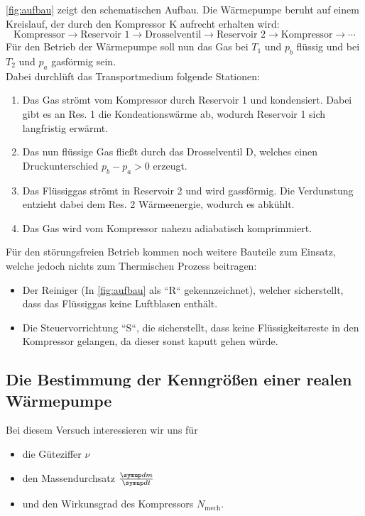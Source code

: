 \autoref{fig:aufbau} zeigt den schematischen Aufbau. Die W\"armepumpe beruht auf einem Kreislauf,
der durch den Kompressor K aufrecht erhalten wird:
\begin{equation}
	\text{Kompressor}
	\rightarrow
	\text{Reservoir 1}
	\rightarrow
	\text{Drosselventil}
	\rightarrow
	\text{Reservoir 2}
	\rightarrow
	\text{Kompressor}
	\rightarrow
	\cdots
	\label{eqn:kreislauf}
\end{equation}
F\"ur den Betrieb der W\"armepumpe soll nun das Gas bei $T_1$ und $p_b$ fl\"ussig und 
bei $T_2$ und $p_a$ gasf\"ormig sein.
\\
Dabei durchl\"uft das Transportmedium folgende Stationen:
\begin{enumerate}
	\item Das Gas str\"omt vom Kompressor durch Reservoir 1 und kondensiert. Dabei gibt es an
		Res. 1 die Kondeationsw\"arme ab, wodurch Reservoir 1 sich langfristig erw\"armt.
	\item Das nun fl\"ussige Gas flie\ss t durch das Drosselventil D, welches einen Druckunterschied
		$p_b - p_a > 0$ erzeugt.
	\item Das Fl\"ussiggas str\"omt in Reservoir 2 und wird gassf\"ormig. Die Verdunstung entzieht 
		dabei dem Res. 2 W\"armeenergie, wodurch es abk\"uhlt.
	\item Das Gas wird vom Kompressor nahezu adiabatisch komprimmiert.
\end{enumerate}

F\"ur den st\"orungsfreien Betrieb kommen noch weitere Bauteile zum Einsatz, welche jedoch nichts zum
Thermischen Prozess beitragen:
\begin{itemize}
	\item Der Reiniger (In \autoref{fig:aufbau} als ``R`` gekennzeichnet), welcher sicherstellt,
		dass das Fl\"ussiggas keine Luftblasen enth\"alt.
	\item Die Steuervorrichtung ``S``, die sicherstellt, dass keine Fl\"ussigkeitsreste in den 
		Kompressor gelangen, da dieser sonst kaputt gehen w\"urde.
\end{itemize}


\subsection{Die Bestimmung der Kenngrößen einer realen
Wärmepumpe}

Bei diesem Versuch interessieren wir uns f\"ur
\begin{itemize}
	\item die G\"uteziffer $\nu$
	\item den Massendurchsatz $\frac{\symup d m}{\symup d t}$
	\item und den Wirkunsgrad des Kompressors  $N_\text{mech}$.
\end{itemize}

